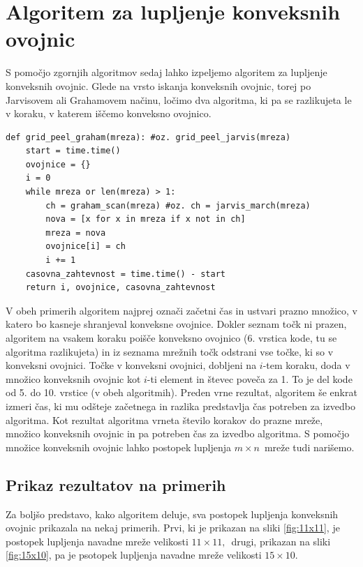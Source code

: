 \documentclass[a4paper]{article}
\begin{document}
\section{Algoritem za lupljenje konveksnih ovojnic}
S pomočjo zgornjih algoritmov sedaj lahko izpeljemo algoritem za lupljenje konveksnih ovojnic. Glede na vrsto iskanja konveksnih ovojnic, torej po Jarvisovem ali 
Grahamovem načinu, ločimo dva algoritma, ki pa se razlikujeta le v koraku, v katerem iščemo konveksno ovojnico.

\begin{lstlisting}
def grid_peel_graham(mreza): #oz. grid_peel_jarvis(mreza)
    start = time.time()
    ovojnice = {}
    i = 0
    while mreza or len(mreza) > 1:
        ch = graham_scan(mreza) #oz. ch = jarvis_march(mreza)
        nova = [x for x in mreza if x not in ch]
        mreza = nova
        ovojnice[i] = ch
        i += 1
    casovna_zahtevnost = time.time() - start 
    return i, ovojnice, casovna_zahtevnost
\end{lstlisting}

V obeh primerih algoritem najprej označi začetni čas in ustvari prazno množico, v katero bo kasneje shranjeval konveksne ovojnice. Dokler seznam točk ni prazen, algoritem na vsakem koraku 
poišče konveksno ovojnico (6. vrstica kode, tu se algoritma razlikujeta) in iz seznama mrežnih točk odstrani vse točke, ki so v konveksni ovojnici. Točke v konveksni ovojnici, dobljeni na 
$i$-tem koraku, doda v množico konveksnih ovojnic kot $i$-ti element in števec poveča za 1. To je del kode od 5. do 10. vrstice (v obeh algoritmih). Preden vrne rezultat, algoritem še enkrat 
izmeri čas, ki mu odšteje začetnega in razlika predstavlja čas potreben za izvedbo algoritma. Kot rezultat algoritma vrneta število korakov do prazne mreže, množico konveksnih ovojnic in pa 
potreben čas za izvedbo algoritma. S pomočjo množice konveksnih ovojnic lahko postopek lupljenja $m \times n$~mreže tudi narišemo.

\subsection{Prikaz rezultatov na primerih}
Za boljšo predstavo, kako algoritem deluje, sva postopek lupljenja konveksnih ovojnic prikazala na nekaj primerih. Prvi, ki je prikazan na sliki \ref{fig:11x11}, je postopek lupljenja 
navadne mreže velikosti $11 \times 11,$~drugi, prikazan na sliki \ref{fig:15x10}, pa je psotopek lupljenja navadne mreže velikosti $15 \times 10$. 
\end{document}
